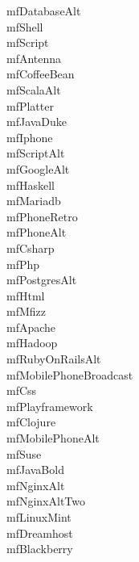 \documentclass[parskip=half, twocolumn, 13pt]{scrartcl}
\begin{document}
\mfDatabaseAlt{} \quad mfDatabaseAlt \\
\mfShell{} \quad mfShell \\
\mfScript{} \quad mfScript \\
\mfAntenna{} \quad mfAntenna \\
\mfCoffeeBean{} \quad mfCoffeeBean \\
\mfScalaAlt{} \quad mfScalaAlt \\
\mfPlatter{} \quad mfPlatter \\
\mfJavaDuke{} \quad mfJavaDuke \\
\mfIphone{} \quad mfIphone \\
\mfScriptAlt{} \quad mfScriptAlt \\
\mfGoogleAlt{} \quad mfGoogleAlt \\
\mfHaskell{} \quad mfHaskell \\
\mfMariadb{} \quad mfMariadb \\
\mfPhoneRetro{} \quad mfPhoneRetro \\
\mfPhoneAlt{} \quad mfPhoneAlt \\
\mfCsharp{} \quad mfCsharp \\
\mfPhp{} \quad mfPhp \\
\mfPostgresAlt{} \quad mfPostgresAlt \\
\mfHtml{} \quad mfHtml \\
\mfMfizz{} \quad mfMfizz \\
\mfApache{} \quad mfApache \\
\mfHadoop{} \quad mfHadoop \\
\mfRubyOnRailsAlt{} \quad mfRubyOnRailsAlt \\
\mfMobilePhoneBroadcast{} \quad mfMobilePhoneBroadcast \\
\mfCss{} \quad mfCss \\
\mfPlayframework{} \quad mfPlayframework \\
\mfClojure{} \quad mfClojure \\
\mfMobilePhoneAlt{} \quad mfMobilePhoneAlt \\
\mfSuse{} \quad mfSuse \\
\mfJavaBold{} \quad mfJavaBold \\
\mfNginxAlt{} \quad mfNginxAlt \\
\mfNginxAltTwo{} \quad mfNginxAltTwo \\
\mfLinuxMint{} \quad mfLinuxMint \\
\mfDreamhost{} \quad mfDreamhost \\
\mfBlackberry{} \quad mfBlackberry \\
\end{document}
